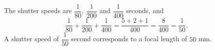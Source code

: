 The shutter speeds are $\dfrac{1}{80}$, $\dfrac{1}{200}$ and $\dfrac{1}{400}$ seconds, and
\[
\dfrac{1}{80}+\dfrac{1}{200}+\dfrac{1}{400}=\dfrac{5+2+1}{400}=\dfrac{8}{400}=\dfrac{1}{50}.
\]
A shutter speed of $\dfrac{1}{50}$ second corresponds to a focal length of $\boxed{50}$ mm.

